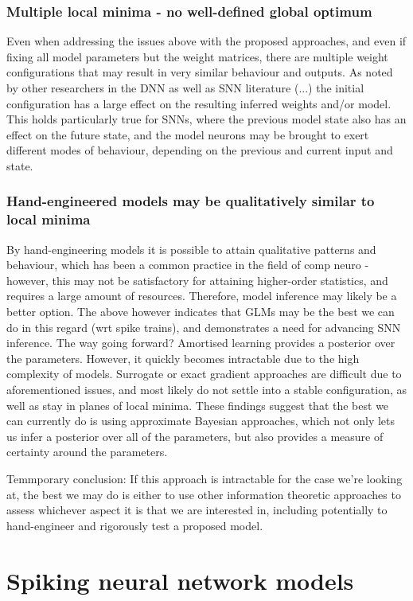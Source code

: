 \documentclass[mphil,deptreport,ai]{infthesis} %
\begin{document}
\subsection{Multiple local minima - no well-defined global optimum}
Even when addressing the issues above with the proposed approaches, and even if fixing all model parameters but the weight matrices, there are multiple weight configurations that may result in very similar behaviour and outputs.
As noted by other researchers in the DNN as well as SNN literature (...) the initial configuration has a large effect on the resulting inferred weights and/or model. This holds particularly true for SNNs, where the previous model state also has an effect on the future state, and the model neurons may be brought to exert different modes of behaviour, depending on the previous and current input and state.

\subsection{Hand-engineered models may be qualitatively similar to local minima}
By hand-engineering models it is possible to attain qualitative patterns and behaviour, which has been a common practice in the field of comp neuro - however, this may not be satisfactory for attaining higher-order statistics, and requires a large amount of resources. Therefore, model inference may likely be a better option. 
The above however indicates that GLMs may be the best we can do in this regard (wrt spike trains), and demonstrates a need for advancing SNN inference.
The way going forward?
Amortised learning provides a posterior over the parameters.
However, it quickly becomes intractable due to the high complexity of models.
Surrogate or exact gradient approaches are difficult due to aforementioned issues, and most likely do not settle into a stable configuration, as well as stay in planes of local minima.
These findings suggest that the best we can currently do is using approximate Bayesian approaches, which not only lets us infer a posterior over all of the parameters, but also provides a measure of certainty around the parameters.

Temmporary conclusion:
If this approach is intractable for the case we’re looking at, the best we may do is either to use other information theoretic approaches to assess whichever aspect it is that we are interested in, including potentially to hand-engineer and rigorously test a proposed model.


\chapter{Spiking neural network models}
\end{document}
